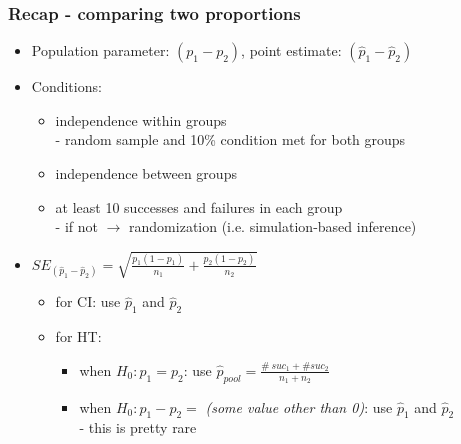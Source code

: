 \documentclass[slidestop,compress,mathserif]{beamer}
\begin{document}
\begin{frame}
\frametitle{Recap - comparing two proportions}

\begin{itemize}

\item Population parameter: $(p_1 - p_2)$, point estimate: $(\hat{p}_1 - \hat{p}_2)$

\pause

\item Conditions:
\pause
\begin{itemize}
\item independence within groups \\
- random sample and 10\% condition met for both groups
\item independence between groups
\item at least 10 successes and failures in each group\\ 
- if not $\rightarrow$ randomization (i.e. simulation-based inference)
\end{itemize}

\pause

\item $SE_{(\hat{p}_1 - \hat{p}_2)} = \sqrt{ \frac{p_1(1-p_1)}{n_1} + \frac{p_2(1-p_2)}{n_2} }$
\begin{itemize}
\item for CI: use $\hat{p}_1$ and $\hat{p}_2$
\item for HT:
\begin{itemize}
\item when $H_0: p_1 = p_2$: use $\hat{p}_{pool} = \frac{\#~suc_1 + \#suc_2}{n_1 + n_2}$
\item when $H_0: p_1 - p_2 = $ \textit{(some value other than 0)}: use $\hat{p}_1$ and $\hat{p}_2$ \\
- this is pretty rare
\end{itemize}
\end{itemize}

\end{itemize}

\end{frame}



\end{document}
